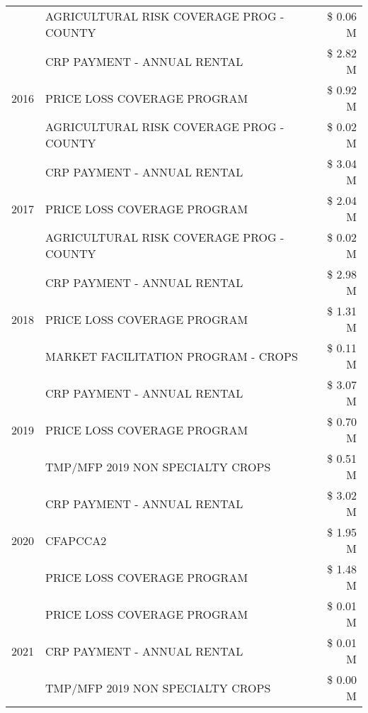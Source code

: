 \begin{tabular}{llr}
 & AGRICULTURAL RISK COVERAGE PROG - COUNTY & \$ 0.06 M \\
\cline{1-3}
\multirow[t]{3}{*}{2016} & CRP PAYMENT - ANNUAL RENTAL                   & \$ 2.82 M \\
 & PRICE LOSS COVERAGE PROGRAM                   & \$ 0.92 M \\
 & AGRICULTURAL RISK COVERAGE PROG - COUNTY      & \$ 0.02 M \\
\cline{1-3}
\multirow[t]{3}{*}{2017} & CRP PAYMENT - ANNUAL RENTAL & \$ 3.04 M \\
 & PRICE LOSS COVERAGE PROGRAM & \$ 2.04 M \\
 & AGRICULTURAL RISK COVERAGE PROG - COUNTY & \$ 0.02 M \\
\cline{1-3}
\multirow[t]{3}{*}{2018} & CRP PAYMENT - ANNUAL RENTAL & \$ 2.98 M \\
 & PRICE LOSS COVERAGE PROGRAM & \$ 1.31 M \\
 & MARKET FACILITATION PROGRAM - CROPS & \$ 0.11 M \\
\cline{1-3}
\multirow[t]{3}{*}{2019} & CRP PAYMENT - ANNUAL RENTAL & \$ 3.07 M \\
 & PRICE LOSS COVERAGE PROGRAM & \$ 0.70 M \\
 & TMP/MFP 2019 NON SPECIALTY CROPS & \$ 0.51 M \\
\cline{1-3}
\multirow[t]{3}{*}{2020} & CRP PAYMENT - ANNUAL RENTAL & \$ 3.02 M \\
 & CFAPCCA2 & \$ 1.95 M \\
 & PRICE LOSS COVERAGE PROGRAM & \$ 1.48 M \\
\cline{1-3}
\multirow[t]{3}{*}{2021} & PRICE LOSS COVERAGE PROGRAM & \$ 0.01 M \\
 & CRP PAYMENT - ANNUAL RENTAL & \$ 0.01 M \\
 & TMP/MFP 2019 NON SPECIALTY CROPS & \$ 0.00 M \\
\cline{1-3}
\bottomrule
\end{tabular}
